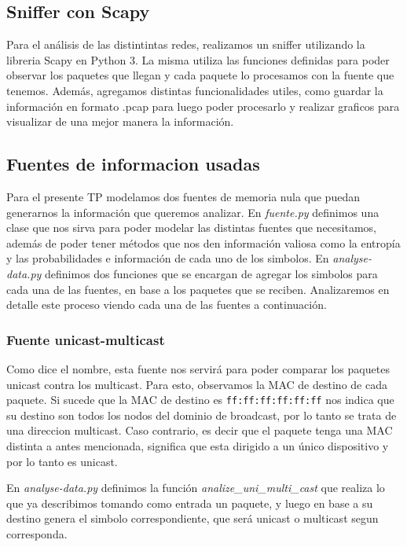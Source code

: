 \subsection{Sniffer con Scapy}

Para el an\'alisis de las distintintas redes, realizamos un sniffer utilizando la libreria Scapy en Python 3. La misma utiliza las funciones definidas para poder observar los paquetes que llegan y cada paquete lo procesamos con la fuente que tenemos. Adem\'as, agregamos distintas funcionalidades utiles, como guardar la informaci\'on en formato .pcap para luego poder procesarlo y realizar graficos para visualizar de una mejor manera la informaci\'on.

\subsection{Fuentes de informacion usadas}

Para el presente TP modelamos dos fuentes de memoria nula que puedan generarnos la informaci\'on que queremos analizar. En \textit{fuente.py} definimos una clase que nos sirva para poder modelar las distintas fuentes que necesitamos, adem\'as de poder tener m\'etodos que nos den informaci\'on valiosa como la entrop\'ia y las probabilidades e informaci\'on de cada uno de los simbolos. En \textit{analyse-data.py} definimos dos funciones que se encargan de agregar los simbolos para cada una de las fuentes, en base a los paquetes que se reciben. Analizaremos en detalle este proceso viendo cada una de las fuentes a continuaci\'on.

\subsubsection{Fuente unicast-multicast}

Como dice el nombre, esta fuente nos servir\'a para poder comparar los paquetes unicast contra los multicast. Para esto, observamos la MAC de destino de cada paquete. Si sucede que la MAC de destino es \texttt{ff:ff:ff:ff:ff:ff} nos indica que su destino son todos los nodos del dominio de broadcast, por lo tanto se trata de una direccion multicast. Caso contrario, es decir que el paquete tenga una MAC distinta a antes mencionada, significa que esta dirigido a un \'unico dispositivo y por lo tanto es unicast.

En \textit{analyse-data.py} definimos la funci\'on \textit{analize\_uni\_multi\_cast} que realiza lo que ya describimos tomando como entrada un paquete, y luego en base a su destino genera el simbolo correspondiente, que será unicast o multicast segun corresponda.


